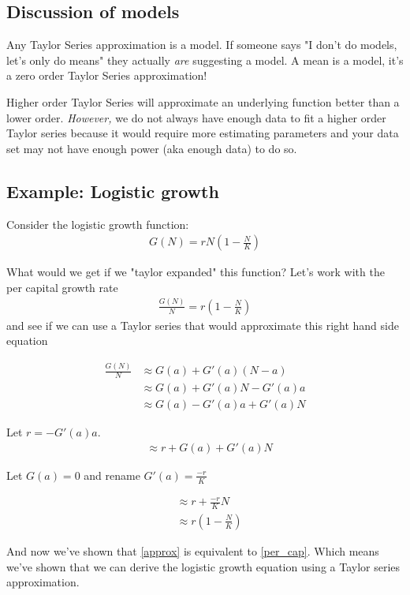 \documentclass{article}
\begin{document}
\subsection{Discussion of models}
Any Taylor Series approximation is a model. If someone says "I don't do models, let's only do means" they actually \textit{are} suggesting a model. A mean is a model, it's a zero order Taylor Series approximation! 

Higher order Taylor Series will approximate an underlying function better than a lower order. \textit{However,} we do not always have enough data to fit a higher order Taylor series because it would require more estimating parameters and your data set may not have enough power (aka enough data) to do so. 

\subsection{Example: Logistic growth}
Consider the logistic growth function: 
\begin{align}
    G(N) = rN (1 - \frac{N}{K})
\end{align}

What would we get if we "taylor expanded" this function? Let's work with the per capital growth rate
\begin{align}
    \frac{G(N)}{N} = r(1 - \frac{N}{K}) \label{per_cap}
\end{align}
and see if we can use a Taylor series that would approximate this right hand side equation

\begin{align}
    \frac{G(N)}{N} &\approx G(a) + G'(a) (N-a)\\
    &\approx G(a) + G'(a)N - G'(a)a \\
    & \approx G(a) - G'(a)a + G'(a) N
\end{align}

Let $r =  - G'(a)a$.
\begin{align}
    & \approx r + G(a) + G'(a) N
\end{align}

Let $G(a) = 0$  and rename $G'(a) = \frac{-r}{K}$

\begin{align}
    &\approx r + \frac{-r}{K}N\\
    &\approx r(1 - \frac{N}{K}) \label{approx}
\end{align}

And now we've shown that \ref{approx} is equivalent to \ref{per_cap}. Which means we've shown that we can derive the logistic growth equation using a Taylor series approximation.
\end{document}
